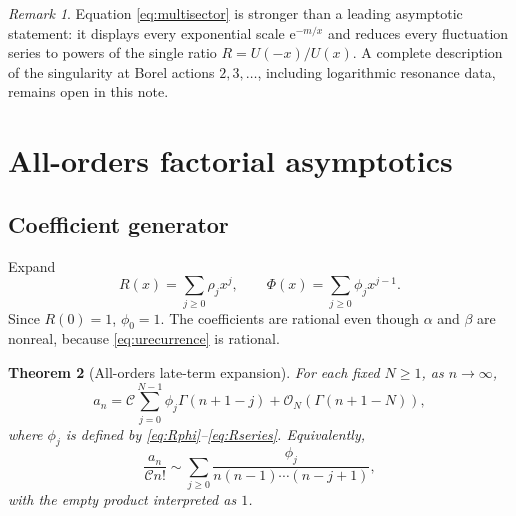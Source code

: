 \documentclass[11pt,a4paper]{article}
\newtheorem{theorem}{Theorem}[section]
\theoremstyle{definition}
\theoremstyle{remark}
\newtheorem{remark}[theorem]{Remark}
\newcommand{\e}{\mathrm{e}}
\newcommand{\bigO}{\mathcal{O}}
\newcommand{\constC}{\mathcal{C}}
\begin{document}
\begin{remark}
Equation \eqref{eq:multisector} is stronger than a leading asymptotic statement: it displays every exponential scale \(\e^{-m/x}\) and reduces every fluctuation series to powers of the single ratio \(R=U(-x)/U(x)\).  A complete description of the singularity at Borel actions \(2,3,\ldots\), including logarithmic resonance data, remains open in this note.
\end{remark}

\section{All-orders factorial asymptotics}\label{sec:allorders}

\subsection{Coefficient generator}

Expand
\begin{equation}\label{eq:Rseries}
 R(x)=\sum_{j\ge0}\rho_jx^j,
 \qquad
 \Phi(x)=\sum_{j\ge0}\phi_jx^{j-1}.
\end{equation}
Since \(R(0)=1\), \(\phi_0=1\).  The coefficients are rational even though \(\alpha\) and \(\beta\) are nonreal, because \eqref{eq:urecurrence} is rational.

\begin{theorem}[All-orders late-term expansion]\label{thm:allorders}
For each fixed \(N\ge1\), as \(n\to\infty\),
\begin{equation}\label{eq:allorders}
 a_n=\constC\sum_{j=0}^{N-1}\phi_j\Gamma(n+1-j)
 +\bigO_N\!\left(\Gamma(n+1-N)\right),
\end{equation}
where \(\phi_j\) is defined by \eqref{eq:Rphi}--\eqref{eq:Rseries}.
Equivalently,
\begin{equation}\label{eq:normalizedfactorial}
 \frac{a_n}{\constC n!}
 \sim\sum_{j\ge0}\frac{\phi_j}
 {n(n-1)\cdots(n-j+1)},
\end{equation}
with the empty product interpreted as \(1\).
\end{theorem}
\end{document}
